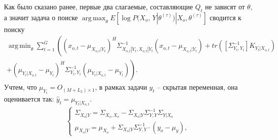 \documentclass[11pt]{article}
\DeclareMathOperator*{\argmax}{arg\,max}
\DeclareMathOperator*{\argmin}{arg\,min}
\begin{document}
Как было сказано ранее, первые два слагаемые, составляющие $Q_t$ не зависят от $\theta$, а значит задача о поиске $\argmax_{\theta} E[\log P(X_o, \, Y|\theta^{(\tau)})|X_o, \theta^{(\tau)}] $ сводится к поиску
\begin{equation}
\begin{gathered}
\argmin_{\theta}  \sum_{t=1}^G \left((x_{o,t}-\mu_{X_{o,t}|Y_t})^H\Sigma_{X_{o,t}|Y_t,X_{o,t}|Y_t}^{-1}(x_{o,t}-\mu_{X_{o,t}|Y_t}) +  tr([\Sigma_{Y_t,Y_t}^{-1}]K_{Y_t|X_{o,t}}) \right. \\ \left. +  (\mu_{Y_t|X_{o,t}}-\mu_{Y_t})^H\Sigma_{Y_t,Y_t}^{-1}(\mu_{Y_t|X_{o,t}}-\mu_{Y_t})\right).
\end{gathered}
\end{equation}
Учтем, что $\mu_{Y_t} = O_{(M+L_2) \times 1}$, в рамках задачи $y_t$ -- скрытая переменная, она оценивается так: $\hat{y}_t = \mu_{Y_t|X_{o,t}}$.
\begin{equation}
\left\{ \begin{gathered} 
\Sigma_{X_o|Y} = \Sigma_{X_o,X_o}-\Sigma_{X_o|Y}\Sigma_{Y,Y}^{-1}\Sigma_{Y|X_o} \\
\mu_{X_o|Y} = \mu_{X_o} + \Sigma_{X_o|Y}\Sigma_{Y,Y}^{-1}\cdot(y_o-\mu_{y}),
\end{gathered} \right.
\end{equation}
\end{document}
